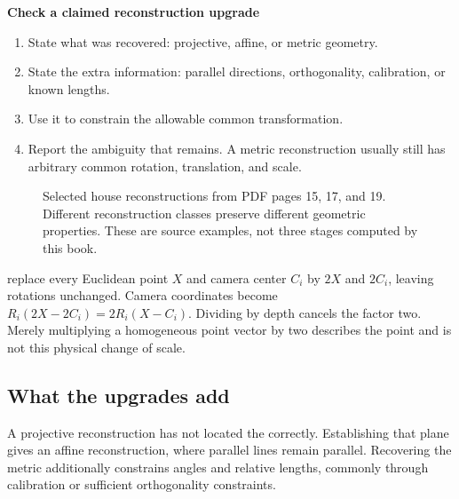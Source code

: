 \documentclass[letterpaper,11pt,english,openany,oneside]{jupyterBook}
\begin{document}
\begin{TextbookBox}
\textbf{Check a claimed reconstruction upgrade}\par\smallskip
\begin{enumerate}
%
\item {}
\sphinxAtStartPar
State what was recovered: projective, affine, or metric geometry.

\item {}
\sphinxAtStartPar
State the extra information: parallel directions, orthogonality, calibration, or known lengths.

\item {}
\sphinxAtStartPar
Use it to constrain the allowable common transformation.

\item {}
\sphinxAtStartPar
Report the ambiguity that remains. A metric reconstruction usually still has arbitrary common rotation, translation, and scale.

\end{enumerate}

\end{TextbookBox}

\begin{figure}[H]
\centering
\capstart

\noindent{}
\caption{Selected house reconstructions from PDF pages 15, 17, and 19. Different reconstruction classes preserve different geometric properties. These are source examples, not three stages computed by this book.}\label{\detokenize{lectures/lecture06/ambiguity:fig-lec06-house}}\end{figure}

\sphinxAtStartPar
{} replace every Euclidean point \(X\) and camera center \(C_i\) by \(2X\) and \(2C_i\), leaving rotations unchanged. Camera coordinates become \(R_i(2X-2C_i)=2R_i(X-C_i)\). Dividing by depth cancels the factor two. Merely multiplying a homogeneous point vector by two describes the  point and is not this physical change of scale.


\subsection{What the upgrades add}
\label{\detokenize{lectures/lecture06/ambiguity:what-the-upgrades-add}}
\sphinxAtStartPar
A projective reconstruction has not located the  correctly. Establishing that plane gives an affine reconstruction, where parallel lines remain parallel. Recovering the metric additionally constrains angles and relative lengths, commonly through calibration or sufficient orthogonality constraints.
\end{document}
